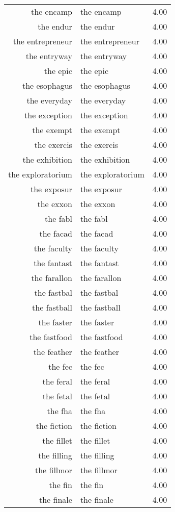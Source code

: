 \begin{table}[ht]
\begin{tabular}{rlr}
  the encamp & the encamp & 4.00 \\ 
  the endur & the endur & 4.00 \\ 
  the entrepreneur & the entrepreneur & 4.00 \\ 
  the entryway & the entryway & 4.00 \\ 
  the epic & the epic & 4.00 \\ 
  the esophagus & the esophagus & 4.00 \\ 
  the everyday & the everyday & 4.00 \\ 
  the exception & the exception & 4.00 \\ 
  the exempt & the exempt & 4.00 \\ 
  the exercis & the exercis & 4.00 \\ 
  the exhibition & the exhibition & 4.00 \\ 
  the exploratorium & the exploratorium & 4.00 \\ 
  the exposur & the exposur & 4.00 \\ 
  the exxon & the exxon & 4.00 \\ 
  the fabl & the fabl & 4.00 \\ 
  the facad & the facad & 4.00 \\ 
  the faculty & the faculty & 4.00 \\ 
  the fantast & the fantast & 4.00 \\ 
  the farallon & the farallon & 4.00 \\ 
  the fastbal & the fastbal & 4.00 \\ 
  the fastball & the fastball & 4.00 \\ 
  the faster & the faster & 4.00 \\ 
  the fastfood & the fastfood & 4.00 \\ 
  the feather & the feather & 4.00 \\ 
  the fec & the fec & 4.00 \\ 
  the feral & the feral & 4.00 \\ 
  the fetal & the fetal & 4.00 \\ 
  the fha & the fha & 4.00 \\ 
  the fiction & the fiction & 4.00 \\ 
  the fillet & the fillet & 4.00 \\ 
  the filling & the filling & 4.00 \\ 
  the fillmor & the fillmor & 4.00 \\ 
  the fin & the fin & 4.00 \\ 
  the finale & the finale & 4.00 \\ 

\end{tabular}
\end{table}
